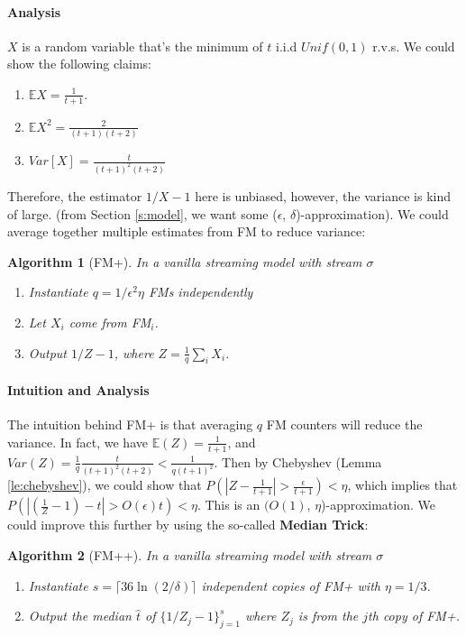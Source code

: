 \documentclass[11pt]{article}
\theoremstyle{plain}
\newtheorem{algorithm}{Algorithm}[section]
\begin{document}
\paragraph{Analysis} $X$ is a random variable that's the minimum of $t$ 
i.i.d $Unif(0,1)$ r.v.s. We could show the following claims: 
\begin{enumerate}
	\item $\mathbb E X = \frac{1}{t+1}$.
	\item $\mathbb E X^2 = \frac{2}{(t+1)(t+2)}$
	\item $Var[X] = \frac{t}{(t+1)^2(t+2)}$
\end{enumerate}
Therefore, the estimator $1/X - 1$ here is unbiased, however, the variance is 
kind of large. (from Section  \ref{s:model}, we want some 	($\epsilon$, 
$\delta$)-approximation). We could average together multiple estimates from 
FM to reduce variance: 

\begin{algorithm}[FM+]
	\label{al:fm+}
	In a vanilla streaming model with stream $\sigma$
	\begin{enumerate}
\item Instantiate $q = 1/\epsilon^2\eta$ FMs independently
\item Let $X_i$ come from FM$_i$.
\item Output $1/Z - 1$, where $Z = \frac1q \sum_i X_i$.
	\end{enumerate}
\end{algorithm}

\paragraph{Intuition and Analysis}
The intuition behind FM+ is that averaging $q$ FM counters will reduce the 
variance. In fact, we have $\mathbb E(Z) = \frac{1}{t+1}$, and $Var(Z) = \frac 
1q \frac{t}{(t+1)^2(t+2)} < \frac{1}{q(t+1)^2}$. Then by Chebyshev 
(Lemma  \ref{le:chebyshev}), we could show that $P(|Z - \frac{1}{t+1}| > 
\frac{\epsilon}{t+1}) < \eta$, which implies that $P(| (\frac{1}{Z} - 1) - t | > 
O(\epsilon)t) < \eta$.  This is an $(O(1)$, 
$\eta$)-approximation. We could improve this further by using the 
so-called \textbf{Median Trick}:

\begin{algorithm}[FM++]
	\label{al:fm++}
	In a vanilla streaming model with stream $\sigma$
	\begin{enumerate}
	\item Instantiate $s = \lceil 36 \ln (2 / \delta) \rceil$ independent copies of 
	FM+ with $\eta = 1/3$.
	\item Output the median $\widehat{t}$ of $\{ 1/Z_j - 1 \}_{j=1}^s$ where 
	$Z_j$ is from the $j$th copy of FM+.
	\end{enumerate}
\end{algorithm}
\end{document}
